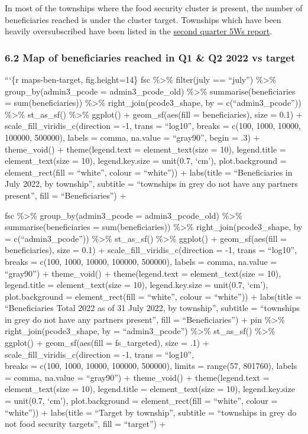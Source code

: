 \documentclass[
]{article}
\begin{document}
In most of the townships where the food security cluster is present, the
number of beneficiaries reached is under the cluster target. Townships
which have been heavily oversubscribed have been listed in the
\href{https://food-security-cluster-myanmar.github.io/fsc_5ws_second_quarter_2022/}{second
quarter 5Ws report}.

\hypertarget{map-of-beneficiaries-reached-in-q1-q2-2022-vs-target}{%
\subsubsection{6.2 Map of beneficiaries reached in Q1 \& Q2 2022 vs
target}\label{map-of-beneficiaries-reached-in-q1-q2-2022-vs-target}}

```\{r maps-ben-target, fig.height=14\} fsc \%\textgreater\% filter(july
== ``july'') \%\textgreater\% group\_by(admin3\_pcode =
admin3\_pcode\_old) \%\textgreater\% summarise(beneficiaries =
sum(beneficiaries)) \%\textgreater\% right\_join(pcode3\_shape, by =
c(``admin3\_pcode'')) \%\textgreater\% st\_as\_sf() \%\textgreater\%
ggplot() + geom\_sf(aes(fill = beneficiaries), size = 0.1) +
scale\_fill\_viridis\_c(direction = -1, trans = ``log10'', breaks =
c(100, 1000, 10000, 100000, 500000), labels = comma, na.value =
``gray90'', begin = .3) + theme\_void() + theme(legend.text =
element\_text(size = 10), legend.title = element\_text(size = 10),
legend.key.size = unit(0.7, `cm'), plot.background = element\_rect(fill
= ``white'', colour = ``white'')) + labs(title = ``Beneficiaries in July
2022, by township'', subtitle = ``townships in grey do not have any
partners present'', fill = ``Beneficiaries'') +

fsc \%\textgreater\% group\_by(admin3\_pcode = admin3\_pcode\_old)
\%\textgreater\% summarise(beneficiaries = sum(beneficiaries))
\%\textgreater\% right\_join(pcode3\_shape, by = c(``admin3\_pcode''))
\%\textgreater\% st\_as\_sf() \%\textgreater\% ggplot() +
geom\_sf(aes(fill = beneficiaries), size = 0.1) +
scale\_fill\_viridis\_c(direction = -1, trans = ``log10'', breaks =
c(100, 1000, 10000, 100000, 500000), labels = comma, na.value =
``gray90'') + theme\_void() + theme(legend.text = element\_text(size =
10), legend.title = element\_text(size = 10), legend.key.size =
unit(0.7, `cm'), plot.background = element\_rect(fill = ``white'',
colour = ``white'')) + labs(title = ``Beneficiaries Total 2022 as of 31
July 2022, by township'', subtitle = ``townships in grey do not have any
partners present'', fill = ``Beneficiaries'') + pin \%\textgreater\%
right\_join(pcode3\_shape, by = ``admin3\_pcode'') \%\textgreater\%
st\_as\_sf() \%\textgreater\%\\
ggplot() + geom\_sf(aes(fill = fs\_targeted), size = .1) +
scale\_fill\_viridis\_c(direction = -1, trans = ``log10'',\\
breaks = c(100, 1000, 10000, 100000, 500000), limits = range(57,
801760), labels = comma, na.value = ``gray90'') + theme\_void() +
theme(legend.text = element\_text(size = 10), legend.title =
element\_text(size = 10), legend.key.size = unit(0.7, `cm'),
plot.background = element\_rect(fill = ``white'', colour = ``white'')) +
labs(title = ``Target by township'', subtitle = ``townships in grey do
not food security targets'', fill = ``target'') +
\end{document}
